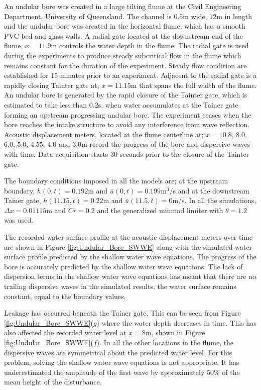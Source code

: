 \documentclass[SingleSpace,12pt]{Serre_ASCE}
\begin{document}
An undular bore was created in a  large tilting flume at the Civil Engineering Department, University of Queensland. The channel is $0.5$m wide, $12$m in length and the undular bore was created in the horizontal flume, which has a smooth PVC bed and glass walls. A radial gate located at the downstream end of the flume, $x = 11.9$m controls the water depth in the flume. The radial gate is used during the experiments to produce steady subcritical flow in the flume which remains constant for the duration of the experiment. Steady flow condition are established for 15 minutes prior to an experiment. Adjacent to the radial gate is a rapidly closing Tainter gate at, $x = 11.15$m that spans the full width of the flume.  An undular bore is generated by the rapid closure of the Tainter gate, which is estimated to take less than $0.2$s, when water accumulates at the Tainer gate forming an upstream progressing undular bore. The experiment ceases when the bore reaches the intake structure to avoid any interference from wave reflection. Acoustic displacement meters, located at the flume centerline at; $x = 10.8$, $8.0$, $6.0$, $5.0$, $4.55$, $4.0$ and $3.0$m record the progress of the bore and dispersive waves with time. Data acquisition starts 30 seconds prior to the closure of the Tainter gate.

The boundary conditions imposed in all the models are; at the upstream boundary,  $h(0,t) = 0.192$m and $\bar{u}(0,t) = 0.199$m$^3$/s and at the downstream Tainer gate, $h(11.15,t) = 0.22$m and $\bar{u}(11.5,t) = 0$m/s. In all the simulations, $\Delta x = 0.01115$m and $Cr = 0.2$ and  the generalized minmod limiter with $\theta = 1.2$ was used.

The recorded water surface profile at the acoustic displacement meters over time are shown in Figure \ref{fig:Undular_Bore_SWWE} along with the simulated water surface profile predicted by the shallow water wave equations. The progress of the bore is accurately predicted by the shallow water wave equations. The lack of dispersion terms in the shallow water wave equations has meant that there are no trailing dispersive waves in the simulated results, the water surface remains constant, equal to the boundary values.

Leakage has occurred  beneath the Tainer gate. This can be seen from Figure \ref{fig:Undular_Bore_SWWE}($g$) where the water depth decreases in time. This has also affected the recorded water level at $x = 8$m, shown in Figure \ref{fig:Undular_Bore_SWWE}($f$). In all the other locations in the flume, the dispersive waves are symmetrical about the predicted water level. For this problem, solving the shallow water wave equations is not appropriate. It has underestimated the amplitude of the first wave by approximately $50\%$ of the mean height of the disturbance.
\end{document}
